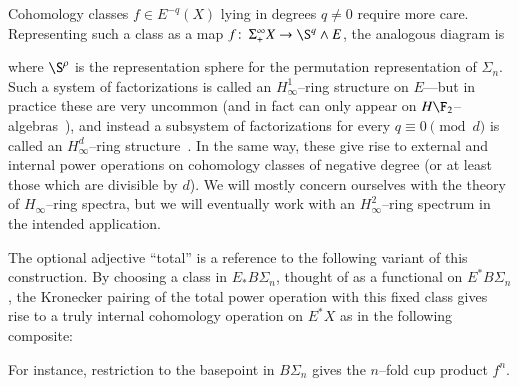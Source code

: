 Cohomology classes $f \in E^{-q}(X)$ lying in degrees $q \ne 0$ require more care.  Representing such a class as a map $f\co \Susp^\infty_+ X \to \S^q \sm E$, the analogous diagram is
\begin{center}
\end{center}
where $\S^\rho$ is the representation sphere for the permutation representation of $\Sigma_n$.  Such a system of factorizations is called an $H_\infty^1$--ring structure on $E$---but in practice these are very uncommon (and in fact can only appear on $H\F_2$--algebras~\cite[Section VII.6.1]{BMMS}), and instead a subsystem of factorizations for every $q \equiv 0 \pmod d$ is called an $H_\infty^d$--ring structure~\cite[Definition I.4.3]{BMMS}.  In the same way, these give rise to external and internal power operations on cohomology classes of negative degree (or at least those which are divisible by $d$).  We will mostly concern ourselves with the theory of $H_\infty$--ring spectra, but we will eventually work with an $H_\infty^2$--ring spectrum in the intended application.

\begin{remark}\label{RestrictingSteenrodOpToBasepoint}
The optional adjective ``total'' is a reference to the following variant of this construction.  By choosing a class in $E_* B\Sigma_n$, thought of as a functional on $E^* B\Sigma_n$, the Kronecker pairing of the total power operation with this fixed class gives rise to a truly internal cohomology operation on $E^* X$ as in the following composite:
\begin{center}
\end{center}
For instance, restriction to the basepoint in $B\Sigma_n$ gives the $n$--fold cup product $f^{n}$.
\end{remark}


